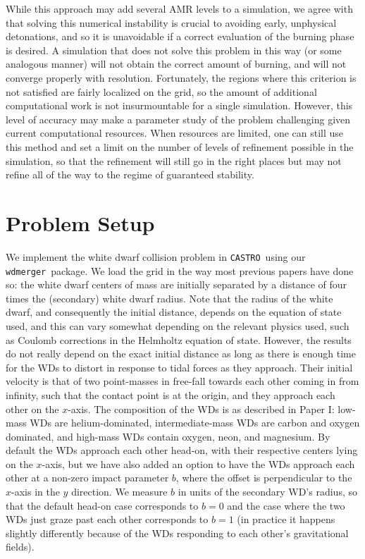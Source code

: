 \documentclass[twocolumn,numberedappendix]{../aastex6}
\newcommand{\castro}{\texttt{CASTRO}}
\newcommand{\wdmerger}{\texttt{wdmerger}}
\begin{document}
While this approach may add several AMR levels 
to a simulation, we agree with \citet{kushnir:2013} that 
solving this numerical instability is crucial to avoiding
early, unphysical detonations, and so it is unavoidable
if a correct evaluation of the burning phase is desired.
A simulation that does not solve this problem in this way
(or some analogous manner) will not obtain the correct amount 
of burning, and will not converge properly with resolution. 
Fortunately, the regions where this criterion is not satisfied 
are fairly localized on the grid, so the amount of additional 
computational work is not insurmountable for a single simulation.
However, this level of accuracy may make a parameter study of
the problem challenging given current computational resources.
When resources are limited, one can still use this method and set a
limit on the number of levels of refinement possible in the simulation,
so that the refinement will still go in the right places but may not
refine all of the way to the regime of guaranteed stability. 



\section{Problem Setup}
\label{sec:problemsetup}

We implement the white dwarf collision problem in \castro\ using our \wdmerger\
package. We load the grid in the way most previous papers have done so:
the white dwarf centers of mass are initially separated by a distance of four times
the (secondary) white dwarf radius. Note that the radius of the white dwarf, and
consequently the initial distance, depends on the equation of state used, and this
can vary somewhat depending on the relevant physics used, such as Coulomb corrections
in the Helmholtz equation of state. However, the results do not really depend on the
exact initial distance as long as there is enough time for the WDs to distort in
response to tidal forces as they approach. Their initial velocity is that of
two point-masses in free-fall towards each other coming in from infinity, such that
the contact point is at the origin, and they approach each other on the $x$-axis.
The composition of the WDs is as described in Paper I: low-mass WDs are helium-dominated,
intermediate-mass WDs are carbon and oxygen dominated, and high-mass WDs contain
oxygen, neon, and magnesium. By default the WDs approach each other head-on, with
their respective centers lying on the $x$-axis, but we have also added an option
to have the WDs approach each other at a non-zero impact parameter $b$, where the
offset is perpendicular to the $x$-axis in the $y$ direction. We measure
$b$ in units of the secondary WD's radius, so that the default head-on case
corresponds to $b = 0$ and the case where the two WDs just graze past each other
corresponds to $b = 1$ (in practice it happens slightly differently because
of the WDs responding to each other's gravitational fields).
\end{document}
